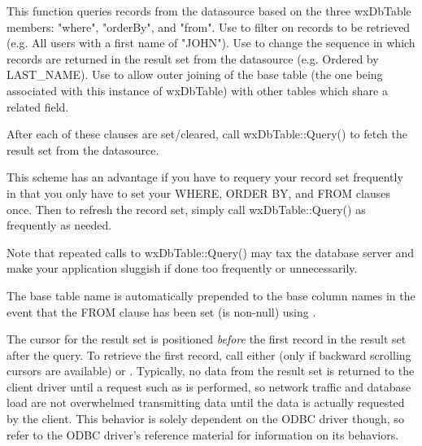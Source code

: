 


This function queries records from the datasource based on the three 
wxDbTable members: "where", "orderBy", and "from".  Use 
 to filter on 
records to be retrieved (e.g. All users with a first name of "JOHN").  
Use  to 
change the sequence in which records are returned in the result set from 
the datasource (e.g. Ordered by LAST\_NAME).  Use 
 to allow outer 
joining of the base table (the one being associated with this instance of 
wxDbTable) with other tables which share a related field.  

After each of these clauses are set/cleared, call wxDbTable::Query() to 
fetch the result set from the datasource.  

This scheme has an advantage if you have to requery your record set 
frequently in that you only have to set your WHERE, ORDER BY, and FROM 
clauses once.  Then to refresh the record set, simply call wxDbTable::Query() 
as frequently as needed.  

Note that repeated calls to wxDbTable::Query() may tax the database 
server and make your application sluggish if done too frequently or 
unnecessarily.  

The base table name is automatically prepended to the base column names in 
the event that the FROM clause has been set (is non-null) using 
.

The cursor for the result set is positioned {\it before} the first record in 
the result set after the query.  To retrieve the first record, call either 
 (only if backward scrolling 
cursors are available) or 
.  Typically, no data from the 
result set is returned to the client driver until a request such as 
 is performed, so network 
traffic and database load are not overwhelmed transmitting data until the 
data is actually requested by the client.  This behavior is solely dependent 
on the ODBC driver though, so refer to the ODBC driver's reference material 
for information on its behaviors.

